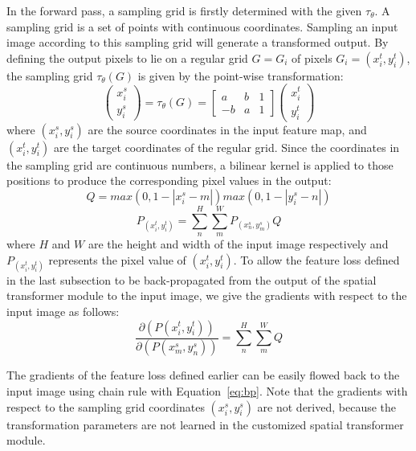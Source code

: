 \documentclass[10pt,twocolumn,letterpaper]{article}
\begin{document}
In the forward pass, a sampling grid is firstly determined with the given $\tau_\theta$. A sampling grid is a set of points with continuous coordinates. Sampling an input image according to this sampling grid will generate a transformed output.
 By defining the output pixels to lie on a regular grid $G = {G_i}$ of pixels $G_i = (x_i^{t},y_i^{t})$, the sampling grid $\tau_\theta(G)$ is given by the point-wise transformation:
\begin{equation}
\left( \begin{array}{l}
x_i^{s}\\
y_i^{s}
\end{array} \right) = {\tau _\theta }(G) = \left[{\begin{array}{*{20}{c}}
a&b&1\\
{ - b}&a&1
\end{array}} \right]\left( \begin{array}{l}
x_i^{t}\\
y_i^{t}
\end{array} \right)
\end{equation}
where $(x_i^{s}, y_i^{s})$ are the source coordinates in the input feature map, and $(x_i^{t}, y_i^{t})$ are the target coordinates of the regular grid. Since the coordinates in the sampling grid are continuous numbers, a bilinear kernel is applied to those positions to produce the corresponding pixel values in the output:
\begin{equation}
Q = max(0,1 - \left| {x_i^{s} - m} \right|)max(0,1 - \left| {y_i^{s} - n} \right|)
\end{equation}
\begin{equation}
P_{(x_i^{t},y_i^{t})}= \sum\limits_n^H {\sum\limits_m^W {P_{(x_n^{s},y_m^{s})}Q} }
\end{equation}
where $H$ and $W$ are the height and width of the input image respectively and $P_{(x_i^{t},y_i^{t})}$ represents the pixel value of $(x_i^{t},y_i^{t})$. To allow the feature loss defined in the last subsection to be back-propagated from the output of the spatial transformer module to the input image, we give the gradients with respect to the input image as follows:
\begin{equation}
\frac{{\partial (P(x_i^t,y_i^t))}}{{\partial (P(x_m^s,y_n^s))}} =\sum\limits_n^H {\sum\limits_m^W {Q} }\label{eq:bp}
\end{equation}

The gradients of the feature loss defined earlier can be easily flowed back to the input image using chain rule with Equation~\ref{eq:bp}. Note that the gradients with respect to the sampling grid coordinates $(x_i^{s}, y_i^{s})$ are not derived, because the transformation parameters are not learned in the customized spatial transformer module.
\end{document}
